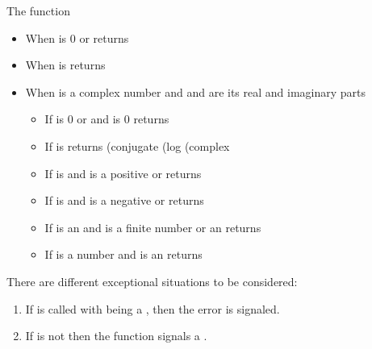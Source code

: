 \documentclass[../Comparisons-Predicates.tex]{subfiles}
\begin{document}
    \noindent
    The function 
    \begin{itemize}
        \item When  is $0$ or  returns
        \item When  is  returns
        \item When  is a complex number and  and
         are its real and imaginary parts
        \begin{itemize}
            \item If  is $0$ or  and
             is $0$ returns  \code{)))}
            \item If  is  returns \code
            {(conjugate (log (complex } 
            \item If  is  and  is a
            positive  or  returns
             
            \item If  is  and  is a
            negative  or  returns
             
            \item If  is an  and 
            is a finite number or an  returns
            \code{)))}
            \item If  is a  number and 
            is an  returns
             \code{)))}
        \end{itemize}
    \end{itemize}


    \DExceptional{}

    There are different exceptional situations to be considered:
    \begin{enumerate}
        \item If  is called with
         being a , then the
         error is signaled.
        \item If  is not \CL{}
         then the function  signals a
        .
    \end{enumerate}
\end{document}
